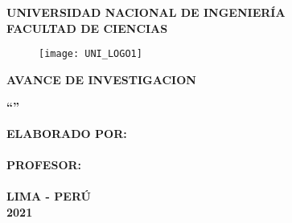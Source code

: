 \begin{titlepage}
	
	\begin{center}
		\vspace*{2 mm}
		{\LARGE \textbf{UNIVERSIDAD NACIONAL DE INGENIERÍA}}\\
		\vspace{5 mm}
		{\LARGE \textbf{FACULTAD DE CIENCIAS}}\\
		\vspace{6.5 mm}
		\begin{figure}[h]
			\centering 
			\texttt{[image: UNI\_LOGO1]}
		\end{figure}
		\vspace{1 mm}	
		{\Large \textbf{AVANCE DE INVESTIGACION} }\\
		\vspace{5 mm}
		
		\onehalfspacing  %
		{\Large \textbf{``{\titulo}''} }\\
		
		\singlespacing  %
		
		\vspace{5 mm}	
		{\large \textbf{ELABORADO POR:} }\\
		\vspace{5 mm}	
		{\large \textbf{\autor} }\\
		\vspace{10 mm}
		{\large \textbf{PROFESOR:} }\\
		\vspace{5 mm}	
		{\large \textbf{\asesor} }\\
		\vspace{10 mm}	
		{\large \textbf{LIMA - PERÚ} }\\
		\vspace{5 mm}	
		{\large \textbf{2021} }\\

	\end{center}

\end{titlepage}


